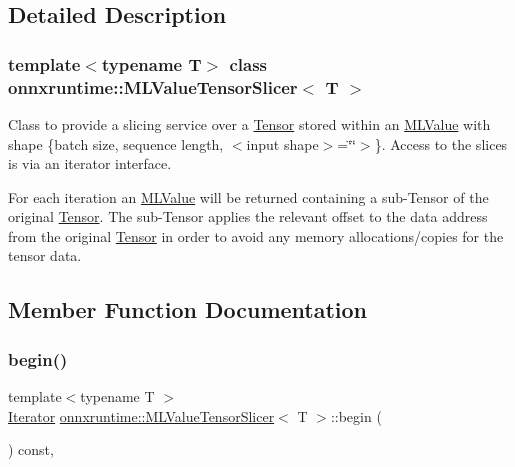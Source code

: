 \subsection{Detailed Description}
\subsubsection*{template$<$typename T$>$\newline
class onnxruntime\+::\+M\+L\+Value\+Tensor\+Slicer$<$ T $>$}

Class to provide a slicing service over a \mbox{\hyperlink{classonnxruntime_1_1Tensor}{Tensor}} stored within an \mbox{\hyperlink{classonnxruntime_1_1MLValue}{M\+L\+Value}} with shape \{batch size, sequence length, $<$input shape$>$=\char`\"{}\char`\"{}$>$\}. Access to the slices is via an iterator interface.

For each iteration an \mbox{\hyperlink{classonnxruntime_1_1MLValue}{M\+L\+Value}} will be returned containing a sub-\/\+Tensor of the original \mbox{\hyperlink{classonnxruntime_1_1Tensor}{Tensor}}. The sub-\/\+Tensor applies the relevant offset to the data address from the original \mbox{\hyperlink{classonnxruntime_1_1Tensor}{Tensor}} in order to avoid any memory allocations/copies for the tensor data. 

\subsection{Member Function Documentation}
\mbox{\label{classonnxruntime_1_1MLValueTensorSlicer_a61d4d62904415b8ed0b12516f396b2d1}} 
\subsubsection{\texorpdfstring{begin()}{begin()}}
{\footnotesize\ttfamily template$<$typename T $>$ \\
\mbox{\hyperlink{classonnxruntime_1_1MLValueTensorSlicer_1_1Iterator}{Iterator}} \mbox{\hyperlink{classonnxruntime_1_1MLValueTensorSlicer}{onnxruntime\+::\+M\+L\+Value\+Tensor\+Slicer}}$<$ T $>$\+::begin (\begin{DoxyParamCaption}{ }\end{DoxyParamCaption}) const\hspace{0.3cm}{\ttfamily [inline]}, {\ttfamily [noexcept]}}

